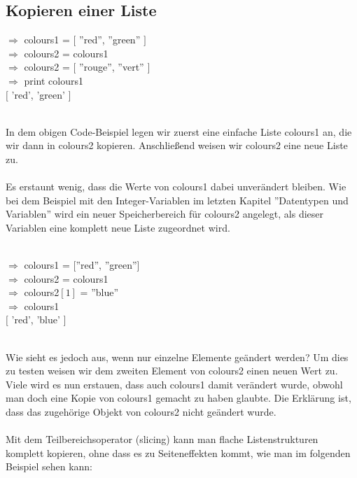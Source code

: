 \subsection{Kopieren einer Liste}
\begin{MyConsoleBox}{
${\Longrightarrow}$ colours1 = $[$ ''red'', ''green'' $]$  \\
${\Longrightarrow}$ colours2 = colours1          \\
${\Longrightarrow}$ colours2 = $[$ ''rouge'', ''vert'' $]$ \\
${\Longrightarrow}$ print colours1               \\
$[$ 'red', 'green' $]$ \\
}\end{MyConsoleBox}
\\
In dem obigen Code-Beispiel legen wir zuerst eine einfache Liste colours1 an, die wir dann in colours2 kopieren. Anschließend weisen wir colours2 eine neue Liste zu.\\
\\
Es erstaunt wenig, dass die Werte von colours1 dabei unverändert bleiben. Wie bei dem Beispiel mit den Integer-Variablen im letzten Kapitel ''Datentypen und Variablen'' wird ein neuer Speicherbereich für colours2 angelegt, als dieser Variablen eine komplett neue Liste zugeordnet wird. \\
\\
\begin{MyConsoleBox}{
${\Longrightarrow}$ colours1 = [''red'', ''green''] \\
${\Longrightarrow}$ colours2 = colours1             \\
${\Longrightarrow}$ colours2$[1]$ = ''blue''        \\
${\Longrightarrow}$ colours1                    \\
$[$ 'red', 'blue' $]$  \\
}\end{MyConsoleBox}
\\
Wie sieht es jedoch aus, wenn nur einzelne Elemente geändert werden?
Um dies zu testen weisen wir dem zweiten Element von colours2 einen neuen Wert zu. Viele wird es nun erstauen, dass auch colours1 damit verändert wurde, obwohl man doch eine Kopie von colours1 gemacht zu haben glaubte. Die Erklärung ist, dass das zugehörige Objekt von colours2 nicht geändert wurde. \\
\\
Mit dem Teilbereichsoperator (slicing) kann man flache Listenstrukturen komplett kopieren, ohne dass es zu Seiteneffekten kommt, wie man im folgenden Beispiel sehen kann: \\
